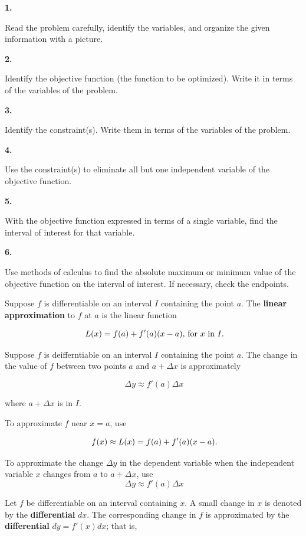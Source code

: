 {\par \bf 1.} Read the problem carefully, identify the
variables, and organize the given information with a picture.

{\par \bf 2.} Identify the objective function (the function to be
optimized). Write it in terms of the variables of the problem.

{\par \bf 3.} Identify the constraint(s). Write them in
terms of the variables of the problem.

{\par \bf 4.} Use the constraint(s) to eliminate all but one
independent variable of the objective function.

{\par \bf 5.} With the objective function expressed in terms
of a single variable, find the interval of interest for that
variable.

{\par \bf 6.} Use methods of calculus to find the absolute
maximum or minimum value of the objective function on
the interval of interest. If necessary, check the endpoints.

\enddef

Suppose $f$ is differentiable on an interval $I$ containing
the point $a$. The {\bf linear approximation} to $f$ at
$a$ is the linear function

$$\
L(x) = f(a) + f'(a)(x -a), \, \hbox{for $x$ in $I$.}
$$
\enddef

Suppose $f$ is deifferntiable on an interval $I$ containing
the point $a$. The change in the value of $f$ between two points
$a$ and $a + \Delta x$ is approximately

$$\
\Delta y \approx f'(a) \Delta x
$$

where $a + \Delta x$ is in $I$.
\enddef

To approximate $f$ near $x = a$, use

$$\
f(x) \approx L(x) = f(a) + f'(a)(x - a) \hbox{.}
$$

To approximate the change $\Delta y$ in the dependent variable
when the independent variable $x$ changes from $a$ to $a + \Delta x$,
use
$$\
\Delta y \approx f'(a)\Delta x
$$

\enddef

Let $f$ be differentiable on an interval containing $x$.
A small change in $x$ is denoted by the {\bf differential} $dx$.
The corresponding change in $f$ is approximated by the
{\bf differential} $dy = f'(x) dx$; that is,

